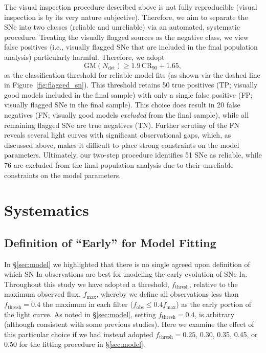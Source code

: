 \documentclass[twocolumn]{aastex63}
\begin{document}
The visual inspection procedure described above is not fully reproducible
(visual inspection is by its very nature subjective). Therefore, we aim to
separate the SNe into two classes (reliable and unreliable) via an automated,
systematic procedure. Treating the visually flagged sources as the negative
class, we view false positives (i.e., visually flagged SNe that are included
in the final population analysis) particularly harmful. Therefore, we adopt
%
$$ \mathrm{GM}(N_\mathrm{det}) \ge 1.9\,\mathrm{CR}_{90} + 1.65,$$
%
as the classification threshold for reliable model fits (as shown via the
dashed line in Figure~\ref{fig:flagged_sn}). This threshold retains 50 true
positives (TP; visually good models included in the final sample) with only a
single false positive (FP; visually flagged SNe in the final sample). This
choice does result in 20 false negatives (FN; visually good models
\textit{excluded} from the final sample), while all remaining flagged SNe are
true negatives (TN). Further scrutiny of the FN reveals several light curves
with significant observational gaps, which, as discussed above, makes it
difficult to place strong constraints on the model parameters. Ultimately, our
two-step procedure identifies 51 SNe as reliable, while 76 are excluded from
the final population analysis due to their unreliable constraints on the model
parameters.

\section{Systematics}\label{sec:systematics}

\subsection{Definition of ``Early'' for Model Fitting}\label{sec:flux_cut}

In \S\ref{sec:model} we highlighted that there is no single agreed upon
definition of which SN Ia observations are best for modeling the early
evolution of SNe Ia. Throughout this study we have adopted a threshold,
$f_\mathrm{thresh}$, relative to the maximum observed flux, $f_\mathrm{max}$,
whereby we define all observations less than $f_\mathrm{thresh} = 0.4$ the
maximum in each filter ($f_\mathrm{obs} \leq 0.4f_\mathrm{max}$) as the early
portion of the light curve. As noted in \S\ref{sec:model}, setting
$f_\mathrm{thresh} = 0.4$, is arbitrary (although consistent with some
previous studies). Here we examine the effect of this particular choice if we
had instead adopted $f_\mathrm{thresh} = 0.25$, 0.30, 0.35, 0.45, or 0.50 for
the fitting procedure in \S\ref{sec:model}.
\end{document}

